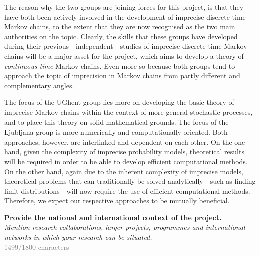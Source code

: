 \documentclass[11pt,dvipsnames,usenames,a4paper]{article}
\begin{document}
The reason why the two groups are joining forces for this project, is that they have both been actively involved in the development of imprecise discrete-time Markov chains, to the extent that they are now recognised as the two main authorities on the topic. 
Clearly, the skills that these groups have developed during their previous---independent---studies of imprecise discrete-time Markov chains will be a major asset for the project, which aims to develop a theory of \emph{continuous-time} Markov chains. 
Even more so because both groups tend to approach the topic of imprecision in Markov chains from partly different and complementary angles.

The focus of the UGhent group lies more on developing the basic theory of imprecise Markov chains within the context of more general stochastic processes, and to place this theory on solid mathematical grounds. 
The focus of the Ljubljana group is more numerically and computationally oriented. 
Both approaches, however, are interlinked and dependent on each other. 
On the one hand, given the complexity of imprecise probability models, theoretical results will be required in order to be able to develop efficient computational methods. 
On the other hand, again due to the inherent complexity of imprecise models, theoretical problems that can traditionally be solved analytically---such as finding limit distributions---will now require the use of efficient computational methods. 
Therefore, we expect our respective approaches to be mutually beneficial.




\textbf{Provide the national and international context of the project.}\\
\textit{Mention research collaborations, larger projects, programmes and international networks in which your research can be situated.}\\
\textcolor{Gray}{1499/1800 characters}
\end{document}
